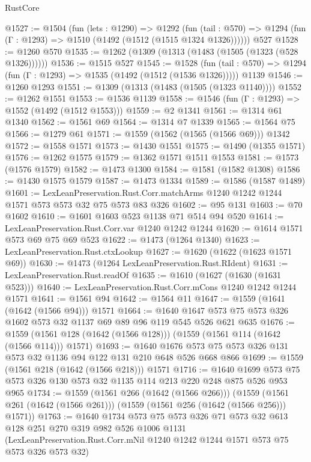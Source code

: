 \begin{lexlean}{RustCore}
\begin{coremodule}
@1527 := @1504
    (fun (lets : @1290) =>
    @1292
      (fun (tail : @570) => @1294 (fun (Γ : @1293) => @1510 (@1492 (@1512 (@1515 @1324 @1326))))))
    @527
@1528 := @1260 @570
@1535 := @1262 (@1309 (@1313 (@1483 (@1505 (@1323 (@528 @1326))))))
@1536 := @1515 @527
@1545 := @1528
    (fun (tail : @570) => @1294 (fun (Γ : @1293) => @1535 (@1492 (@1512 (@1536 @1326)))))
    @1139
@1546 := @1260 @1293
@1551 := @1309 (@1313 (@1483 (@1505 (@1323 @1140))))
@1552 := @1262 @1551
@1553 := @1536 @1139
@1558 := @1546 (fun (Γ : @1293) => @1552 (@1492 (@1512 @1553)))
@1559 := @2 @1341
@1561 := @1314 @61 @1340
@1562 := @1561 @69
@1564 := @1314 @7 @1339
@1565 := @1564 @75
@1566 := @1279 @61
@1571 := @1559 (@1562 (@1565 (@1566 @69))) @1342
@1572 := @1558 @1571
@1573 := @1430 @1551
@1575 := @1490 (@1355 @1571)
@1576 := @1262 @1575
@1579 := @1362 @1571 @1511 @1553
@1581 := @1573 (@1576 @1579)
@1582 := @1473 @1300
@1584 := @1581 (@1582 @1308)
@1586 := @1430 @1575 @1579
@1587 := @1473 @1334
@1589 := @1586 (@1587 @1489)
@1601 := LexLeanPreservation.Rust.Corr.matchArms
    @1240
    @1242
    @1244
    @1571
    @573
    @573
    @32
    @75
    @573
    @83
    @326
@1602 := @95 @131
@1603 := @70 @1602
@1610 := @1601 @1603 @523 @1138 @71 @514 @94 @520
@1614 := LexLeanPreservation.Rust.Corr.var @1240 @1242 @1244
@1620 := @1614 @1571 @573 @69 @75 @69 @523
@1622 := @1473 (@1264 @1340)
@1623 := LexLeanPreservation.Rust.ctxLookup
@1627 := @1620 (@1622 (@1623 @1571 @69))
@1630 := @1473 (@1264 LexLeanPreservation.Rust.RIdent)
@1631 := LexLeanPreservation.Rust.readOf
@1635 := @1610 (@1627 (@1630 (@1631 @523)))
@1640 := LexLeanPreservation.Rust.Corr.mCons @1240 @1242 @1244 @1571
@1641 := @1561 @94
@1642 := @1564 @11
@1647 := @1559 (@1641 (@1642 (@1566 @94))) @1571
@1664 := @1640 @1647 @573 @75 @573 @326 @1602 @573 @32 @1137 @69 @89 @96 @119 @545 @526 @621 @635
@1676 := @1559 (@1561 @128 (@1642 (@1566 @128))) (@1559 (@1561 @114 (@1642 (@1566 @114))) @1571)
@1693 := @1640 @1676 @573 @75 @573 @326 @131 @573 @32 @1136 @94 @122 @131 @210 @648 @526 @668 @866
@1699 := @1559 (@1561 @218 (@1642 (@1566 @218))) @1571
@1716 := @1640 @1699 @573 @75 @573 @326 @130 @573 @32 @1135 @114 @213 @220 @248 @875 @526 @953 @965
@1734 := @1559
    (@1561 @266 (@1642 (@1566 @266)))
    (@1559 (@1561 @261 (@1642 (@1566 @261))) (@1559 (@1561 @256 (@1642 (@1566 @256))) @1571))
@1763 := @1640
    @1734
    @573
    @75
    @573
    @326
    @71
    @573
    @32
    @613
    @128
    @251
    @270
    @319
    @982
    @526
    @1006
    @1131
    (LexLeanPreservation.Rust.Corr.mNil @1240 @1242 @1244 @1571 @573 @75 @573 @326 @573 @32)

\end{coremodule}
\end{lexlean}
